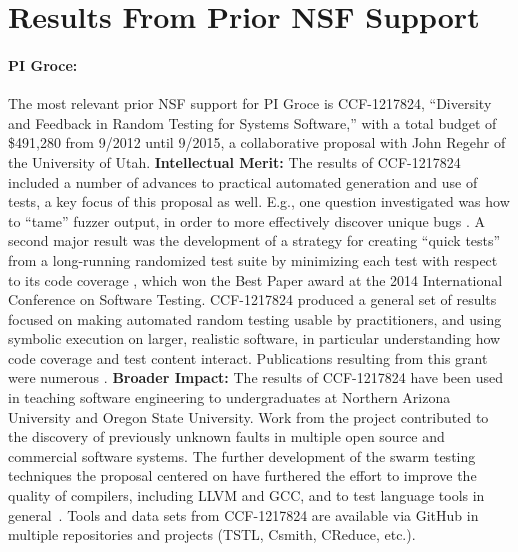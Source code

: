 \section{Results From Prior NSF Support}

\paragraph{PI Groce:}
The most relevant prior NSF support for PI Groce is
CCF-1217824, ``Diversity and Feedback in Random Testing for Systems
Software,'' with a total budget of \$491,280 from 9/2012 until 9/2015,
a collaborative proposal with John Regehr of the University of
Utah. {\bf Intellectual Merit:} The results of CCF-1217824 included a number of advances to practical automated generation and use of tests, a key focus of this proposal as well.  E.g., one question investigated was how to 
``tame'' fuzzer output, in order to more effectively discover unique bugs
\cite{PLDI13}.   A second major result was the development of a strategy for creating ``quick
tests'' from a long-running randomized test suite by minimizing each
test with respect to its code coverage \cite{icst2014}, which won the
Best Paper award at the 2014 International Conference on Software
Testing.  CCF-1217824
produced a general set of results focused on making automated random
testing usable by practitioners, and using symbolic execution on
larger, realistic software, in particular understanding how code
coverage and test content interact.  Publications resulting from this grant
were numerous
\cite{Onward14,PLDI13,issta14,icst2014,helphelp,DirectedSwarm,stvrcausereduce,tstlsttt,ISSTA15,ASEAdeq}. {\bf
  Broader
  Impact:} The results of CCF-1217824 have been used in teaching software
engineering to undergraduates at Northern Arizona University and Oregon State University.
Work from the project contributed to the discovery of previously
unknown faults in multiple open source and commercial software
systems.  The further development of the swarm testing techniques the
proposal centered on have furthered the effort to improve
the quality of compilers, including LLVM and GCC, and to test language
tools in
general~\cite{ZhendongPLDI14,beginnerluck,dewey2015fuzzing,le2015randomized}.
Tools and data sets from CCF-1217824 are available via GitHub in
multiple repositories and projects (TSTL, Csmith, CReduce, etc.).

